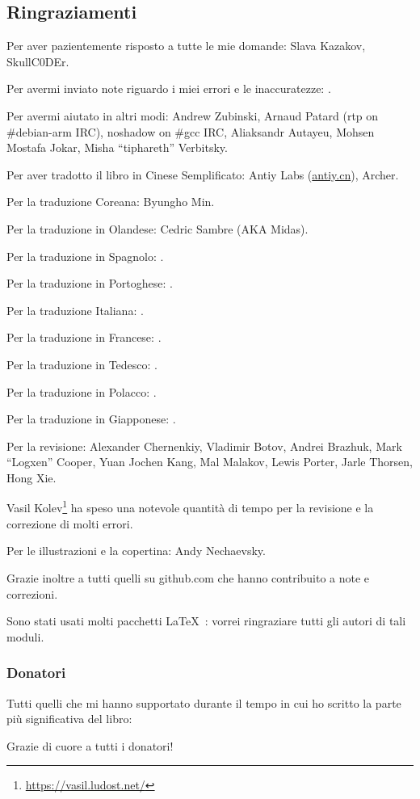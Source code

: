 \subsection*{Ringraziamenti}

Per aver pazientemente risposto a tutte le mie domande: Slava  Kazakov, SkullC0DEr.

Per avermi inviato note riguardo i miei errori e le inaccuratezze: \PeopleMistakesInaccuracies{}.

Per avermi aiutato in altri modi:
Andrew Zubinski,
Arnaud Patard (rtp on \#debian-arm IRC),
noshadow on \#gcc IRC,
Aliaksandr Autayeu,
Mohsen Mostafa Jokar,
Misha ``tiphareth'' Verbitsky.

Per aver tradotto il libro in Cinese Semplificato:
Antiy Labs (\href{http://antiy.cn}{antiy.cn}), Archer.

Per la traduzione Coreana: Byungho Min.

Per la traduzione in Olandese: Cedric Sambre (AKA Midas).

Per la traduzione in Spagnolo: \PeopleSpanishTranslators{}.

Per la traduzione in Portoghese: \PeoplePTBRTranslators{}.

Per la traduzione Italiana: \PeopleItalianTranslators{}.

Per la traduzione in Francese: \PeopleFrenchTranslators{}.

Per la traduzione in Tedesco: \PeopleGermanTranslators{}.

Per la traduzione in Polacco: \PeoplePolishTranslators{}.

Per la traduzione in Giapponese: \PeopleJapaneseTranslators{}.

Per la revisione:
Alexander  Chernenkiy,
Vladimir Botov,
Andrei Brazhuk,
Mark ``Logxen'' Cooper, Yuan Jochen Kang, Mal Malakov, Lewis Porter, Jarle Thorsen, Hong Xie.

Vasil Kolev\footnote{\url{https://vasil.ludost.net/}} ha speso una notevole quantità di tempo per la revisione e la correzione di molti errori.

Per le illustrazioni e la copertina: Andy Nechaevsky.

Grazie inoltre a tutti quelli su github.com che hanno contribuito a note e correzioni\FNGithubContributors{}.

Sono stati usati molti pacchetti \LaTeX\ : vorrei ringraziare tutti gli autori di tali moduli.

\subsubsection*{Donatori}

Tutti quelli che mi hanno supportato durante il tempo in cui ho scritto la parte più significativa del libro:



Grazie di cuore a tutti i donatori!
